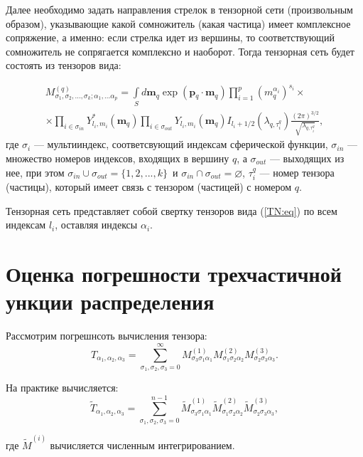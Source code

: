 \documentclass[12pt]{article}
\def\m{\mathbf m{}}
\def\p{\mathbf p{}}
\begin{document}
Далее необходимо задать направления стрелок в тензорной сети (произвольным образом), указывающие какой сомножитель (какая частица) имеет комплексное сопряжение, а именно:
если стрелка идет из вершины, то соответствующий сомножитель не сопрягается комплексно и наоборот.
Тогда тензорная сеть будет состоять из тензоров вида:

\begin{multline}\label{TN:eq}
  M^{(q)}_{\sigma_1, \sigma_2, ..., \sigma_k; \alpha_1, ... \alpha_p} = \int \limits_{S}d\m_q \exp(\p_q\cdot\m_q) \prod_{i=1}^{p}(m_q^{\alpha_i})^{s_i}
  \times \\ \times
  \prod_{i \in \sigma_{in}} Y^{*}_{l_i, m_i}(\m_q) \prod_{i \in \sigma_{out}}Y_{l_i, m_i}(\m_q) I_{l_i+1/2}(\lambda_{q, \tau^q_i})\frac{(2\pi)^{3/2}}{\sqrt{\lambda_{q, \tau^q_i}}},
\end{multline}
где $\sigma_i$ --- мультииндекс, соответсвующий индексам сферической функции, $\sigma_{in}$ --- множество номеров индексов, входящих в вершину $q$, а $\sigma_{out}$ --- выходящих из нее, при этом $\sigma_{in} \cup \sigma_{out} = \{1, 2, ..., k\} \,$ и $ \sigma_{in} \cap \sigma_{out} = \varnothing$,
$\tau^q_i$ --- номер тензора (частицы), который имеет связь с тензором (частицей) с номером $q$.

Тензорная сеть представляет собой свертку тензоров вида (\ref{TN:eq}) по всем индексам $l_i$, оставляя индексы $\alpha_i$. 

\section{Оценка погрешности трехчастичной ункции распределения}

Рассмотрим погрешнсоть вычисления тензора:
\begin{equation}\label{exact_tensor}
  T_{\alpha_1, \alpha_2, \alpha_3} = \sum\limits_{\sigma_1, \sigma_2, \sigma_3 = 0}^{\infty}M^{(1)}_{\sigma_3\sigma_1\alpha_1}M^{(2)}_{\sigma_1\sigma_2\alpha_2}M^{(3)}_{\sigma_2\sigma_3\alpha_3}.
\end{equation}

На практике вычисляется:
\begin{equation}\label{approx_tensor}
  \tilde{T}_{\alpha_1, \alpha_2, \alpha_3} = \sum\limits_{\sigma_1, \sigma_2, \sigma_3 = 0}^{n-1}\tilde{M}^{(1)}_{\sigma_3\sigma_1\alpha_1}\tilde{M}^{(2)}_{\sigma_1\sigma_2\alpha_2}\tilde{M}^{(3)}_{\sigma_2\sigma_3\alpha_3}, 
\end{equation}

где $\tilde{M}^{(i)}$ вычисляется численным интегрированием.
\end{document}
